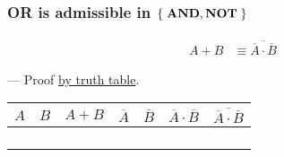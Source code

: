 \begin{frame}

\frametitle{OR is admissible in $ \mathopen{}\left\{\mathrel{}\text{\textbf{AND}}, \text{\textbf{NOT}}\mathrel{}\right\}\mathclose{} $}

\begin{minipage}[t][0.5in]{\textwidth}
\begin{align*}
A + B %
&\equiv \overline{\overline{A}\cdot\overline{B}}
\end{align*}
\end{minipage}

\begin{flushright}
--- Proof \underline{by truth table}.
\end{flushright}

\pause

\vspace{\fill}

\begin{center}

\begin{tabular}{cc|>{\centering\arraybackslash}p{0.4in}|c|c|>{\centering\arraybackslash}p{0.4in}|>{\centering\arraybackslash}p{0.4in}}
$A$ & $B$ & $A + B$ & $\overline{A}$ & $\overline{B}$ %
  & $\overline{A} \cdot \overline{B}$ %
  & $\overline{\overline{A} \cdot \overline{B}}$\\\hline
\bz{} & \bz{} & \bz{} & \bo{} & \bo{} & \bo{} & \bz{} \\
\bz{} & \bo{} & \bo{} & \bo{} & \bz{} & \bz{} & \bo{} \\
\bo{} & \bz{} & \bo{} & \bz{} & \bo{} & \bz{} & \bo{} \\
\bo{} & \bo{} & \bo{} & \bz{} & \bz{} & \bz{} & \bo{}
\end{tabular}

\end{center}

\vspace{\fill}

\end{frame}

